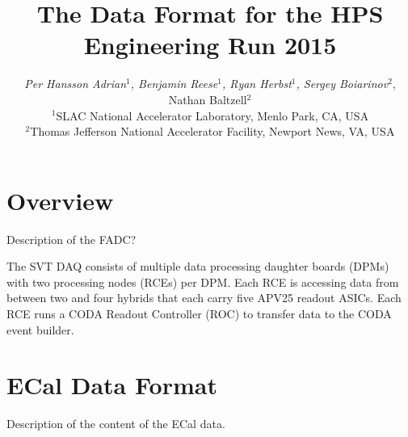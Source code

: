 \documentclass{desyproc}
\begin{document}
\title{The Data Format for the HPS Engineering Run 2015 }

\author{{\slshape Per Hansson Adrian$^1$, Benjamin Reese$^1$, Ryan Herbst$^1$, Sergey Boiarinov$^2$}, Nathan Baltzell$^2$\\
$^1$SLAC National Accelerator Laboratory, Menlo Park, CA, USA\\
$^2$Thomas Jefferson National Accelerator Facility, Newport News, VA, USA}



\maketitle







\section{Overview}

Description of the FADC?


The SVT DAQ consists of multiple data processing daughter boards (DPMs) with two processing nodes (RCEs) per DPM. 
Each RCE is accessing data from between two and four hybrids that each carry five APV25 readout ASICs. Each RCE 
runs a CODA Readout Controller  (ROC) to transfer data to the CODA event builder. 

\section{ECal Data Format}

Description of the content of the ECal data.
\end{document}
